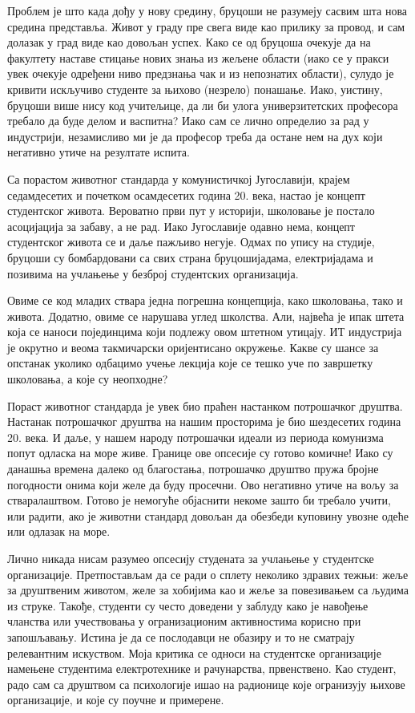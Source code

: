 \documentclass[b5paper]{article}
\begin{document}
Проблем је што када дођу у нову средину, бруцоши не разумеју сасвим шта нова средина представља. Живот у граду пре свега виде као прилику за провод, и сам долазак у град виде као довољан успех. Како се од бруцоша очекује да на факултету наставе стицање нових знања из жељене области (иако се у пракси увек очекује одређени ниво предзнања чак и из непознатих области), сулудо је кривити искључиво студенте за њихово (незрело) понашање. Иако, уистину, бруцоши више нису код учитељице, да ли би улога универзитетских професора требало да буде делом и васпитна? Иако сам се лично определио за рад у индустрији, незамисливо ми је да професор треба да остане нем на дух који негативно утиче на резултате испита.

Са порастом животног стандарда у комунистичкој Југославији, крајем седамдесетих и почетком осамдесетих година 20. века, настао је концепт студентског живота. Вероватно први пут у историји, школовање је постало асоцијација за забаву, а не рад. Иако Југославије одавно нема, концепт студентског живота се и даље пажљиво негује. Одмах по упису на студије, бруцоши су бомбардовани са свих страна бруцошијадама, електријадама и позивима на учлањење у безброј студентских организација.

Овиме се код младих ствара једна погрешна концепција, како школовања, тако и живота. Додатно, овиме се нарушава углед школства. Али, највећа је ипак штета која се наноси појединцима који подлежу овом штетном утицају. ИТ индустрија је окрутно и веома такмичарски оријентисано окружење. Какве су шансе за опстанак уколико одбацимо учење лекција које се тешко уче по завршетку школовања, а које су неопходне?

Пораст животног стандарда је увек био праћен настанком потрошачког друштва. Настанак потрошачког друштва на нашим просторима је био шездесетих година 20. века. И даље, у нашем народу потрошачки идеали из периода комунизма попут одласка на море живе. Границе ове опсесије су готово комичне! Иако су данашња времена далеко од благостања, потрошачко друштво пружа бројне погодности онима који желе да буду просечни. Ово негативно утиче на вољу за стваралаштвом. Готово је немогуће објаснити некоме зашто би требало учити, или радити, ако је животни стандард довољан да обезбеди куповину увозне одеће или одлазак на море.

Лично никада нисам разумео опсесију студената за учлањење у студентске организације. Претпостављам да се ради о сплету неколико здравих тежњи: жеље за друштвеним животом, желе за хобијима као и жеље за повезивањем са људима из струке. Такође, студенти су често доведени у заблуду како је навођење чланства или учествовања у огранизационим активностима корисно при запошљавању. Истина је да се послодавци не обазиру и то не сматрају релевантним искуством. Моја критика се односи на студентске организације намењене студентима електротехнике и рачунарства, првенствено. Као студент, радо сам са друштвом са психологије ишао на радионице које огранизују њихове организације, и које су поучне и примерене.
\end{document}
